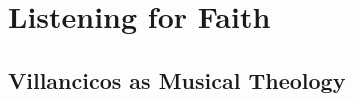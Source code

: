 \part{Listening for Faith}
\label{part:faith}

\chapter{Villancicos as Musical Theology}
\label{ch:intro}

\endinput

